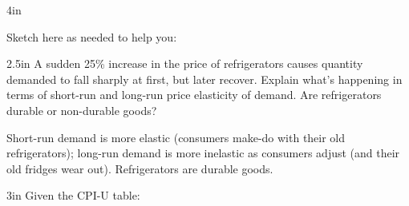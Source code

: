 \documentclass[12pt]{exam}
\begin{document}
\begin{questions}
\begin{problem}[15]{4in}
\begin{center}
    \end{center}

    Sketch here as needed to help you:

  \end{problem}


  \begin{shortanswer}[10]{2.5in}
    A sudden 25\% increase in the price of refrigerators causes quantity
    demanded to fall sharply at first, but later recover. Explain what's happening
    in terms of short-run and long-run price elasticity of demand.  Are refrigerators
    durable or non-durable goods?
  \end{shortanswer}

  \begin{solution}
    Short-run demand is more elastic (consumers make-do with their old refrigerators); long-run
    demand is more inelastic as consumers adjust (and their old fridges wear out). Refrigerators
    are durable goods.
  \end{solution}


  \begin{problem}[15]{3in}
    Given the CPI-U table:

    \begin{center}
      \renewcommand{\arraystretch}{1.4}
      \setlength{\tabcolsep}{12pt}


\end{center}
\end{problem}
\end{questions}
\end{document}

